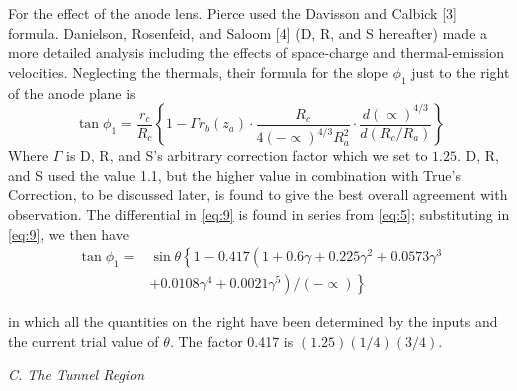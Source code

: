 \documentclass[10pt,a4paper,UTF8,fleqn]{article}
\begin{document}
For the effect of the anode lens. Pierce used the Davisson and Calbick [3] formula. Danielson, Rosenfeid, and Saloom [4] (D, R, and S hereafter) made a more detailed analysis including the effects of space-charge and thermal-emission velocities. Neglecting the thermals, their formula for the slope $ \phi_1 $ just to the right of the anode plane is
\begin{equation} \label{eq:9}
	\tan\phi_1 = \frac{r_c}{R_c}\left\lbrace 1- \Gamma r_b\left(z_a\right)\cdot\frac{R_c}{4\left(-\varpropto\right)^{4/3}R_a^2} \cdot \frac{d\left(\varpropto\right)^{4/3}}{d\left(R_c/R_a\right)}\right\rbrace
\end{equation}
Where $ \Gamma $ is D, R, and S's arbitrary correction factor which we set to $ 1.25 $. D, R, and S used the value 1.1, but the higher value in combination with True's Correction, to be discussed later, is found to give the best overall agreement with observation. The differential in \eqref{eq:9} is found in series from \eqref{eq:5}; substituting in \eqref{eq:9}, we then have
\begin{equation}\label{eq:10}
	\begin{split} 
	\tan\phi_1 = &\sin\theta\left\lbrace\right. 1-0.417\left(\right. 1+0.6\gamma+0.225\gamma^2+0.0573\gamma^3  \\ &+0.0108\gamma^4 + 0.0021\gamma^5 \left.\right) /\left(-\varpropto \right)\left. \right\rbrace 
	\end{split}
\end{equation}

in which all the quantities on the right have been determined by the inputs and the current trial value of $ \theta $. The factor 0.417 is $ (1.25)(1/4)(3/4) $.

\vspace{2ex}\textit{C. The Tunnel Region}\vspace{0.5ex}
\end{document}
